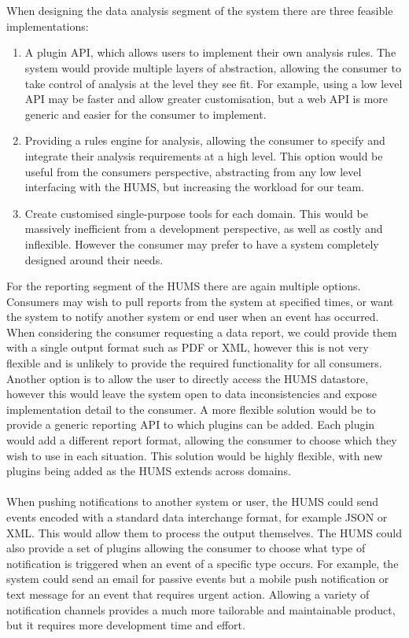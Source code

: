 \documentclass[10pt,a4paper]{article}
\begin{document}
\\ \\
When designing the data analysis segment of the system there are three feasible implementations:
\begin{enumerate}
\item A plugin API, which allows users to implement their own analysis rules. The system would provide multiple layers of abstraction, allowing the consumer to take control of analysis at the level they see fit. For example, using a low level API may be faster and allow greater customisation, but a web API is more generic and easier for the consumer to implement.
\item Providing a rules engine for analysis, allowing the consumer to specify and integrate their analysis requirements at a high level. This option would be useful from the consumers perspective, abstracting from any low level interfacing with the HUMS, but increasing the workload for our team.
\item Create customised single-purpose tools for each domain. This would be massively inefficient from a development perspective, as well as costly and inflexible. However the consumer may prefer to have a system completely designed around their needs. \\
\end{enumerate}
For the reporting segment of the HUMS there are again multiple options. Consumers may wish to pull reports from the system at specified times, or want the system to notify another system or end user when an event has occurred. When considering the consumer requesting a data report, we could provide them with a single output format such as PDF or XML, however this is not very flexible and is unlikely to provide the required functionality for all consumers. Another option is to allow the user to directly access the HUMS datastore, however this would leave the system open to data inconsistencies and expose implementation detail to the consumer. A more flexible solution would be to provide a generic reporting API to which plugins can be added. Each plugin would add a different report format, allowing the consumer to choose which they wish to use in each situation. This solution would be highly flexible, with new plugins being added as the HUMS extends across domains.
\\ \\
When pushing notifications to another system or user, the HUMS could send events encoded with a standard data interchange format, for example JSON or XML. This would allow them to process the output themselves. The HUMS could also provide a set of plugins allowing the consumer to choose what type of notification is triggered when an event of a specific type occurs. For example, the system could send an email for passive events but a mobile push notification or text message for an event that requires urgent action. Allowing a variety of notification channels provides a much more tailorable and maintainable product, but it requires more development time and effort.
\end{document}
